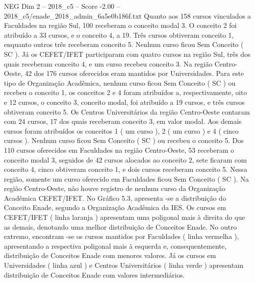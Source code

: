 \begin{textsample}{NEG Dim 2 – 2018\_c5 – Score -2.00 – 2018\_c5/enade\_2018\_admin\_6a5e0b186f.txt}
Quanto aos 158 cursos vinculados a Faculdades na região Sul, 100 receberam o conceito modal 3.
O conceito 2 foi atribuído a 33 cursos, e o conceito 4, a 19.
Três cursos obtiveram conceito 1, enquanto outros três receberam conceito 5.
Nenhum curso ficou Sem Conceito ( SC ).
Já os CEFET/IFET participaram com quatro cursos na região Sul, três dos quais receberam conceito 4, e um curso recebeu conceito 3.
Na região Centro-Oeste, 42 dos 176 cursos oferecidos eram mantidos por Universidades.
Para este tipo de Organização Acadêmica, nenhum curso ficou Sem Conceito ( SC ) ou recebeu o conceito 1, os conceitos 2 e 4 foram atribuídos a, respectivamente, oito e 12 cursos, o conceito 3, conceito modal, foi atribuído a 19 cursos, e três cursos obtiveram conceito 5.
Os Centros Universitários da região Centro-Oeste contaram com 24 cursos, 17 dos quais receberam conceito 3, em valor modal.
Aos demais cursos foram atribuídos os conceitos 1 ( um curso ), 2 ( um curso ) e 4 ( cinco cursos ).
Nenhum curso ficou Sem Conceito ( SC ) ou recebeu o conceito 5.
Dos 110 cursos oferecidos em Faculdades na região Centro-Oeste, 53 receberam o conceito modal 3, seguidos de 42 cursos alocados ao conceito 2, sete ficaram com conceito 4, cinco obtiveram conceito 1, e dois cursos receberam conceito 5.
Nessa região, somente um curso oferecido em Faculdades ficou Sem Conceito ( SC ).
Na região Centro-Oeste, não houve registro de nenhum curso da Organização Acadêmica CEFET/IFET.
No Gráfico 5.3, apresenta -se a distribuição do Conceito Enade, segundo a Organização Acadêmica da IES.
Os cursos em CEFET/IFET ( linha laranja ) apresentam uma poligonal mais à direita do que as demais, denotando uma melhor distribuição de Conceitos Enade.
No outro extremo, encontram -se os cursos mantidos por Faculdades ( linha vermelha ), apresentando a respectiva poligonal mais à esquerda e, consequentemente, distribuição de Conceitos Enade com menores valores.
Já os cursos em Universidades ( linha azul ) e Centros Universitários ( linha verde ) apresentam distribuição de Conceitos Enade com valores intermediários.

\end{textsample}
